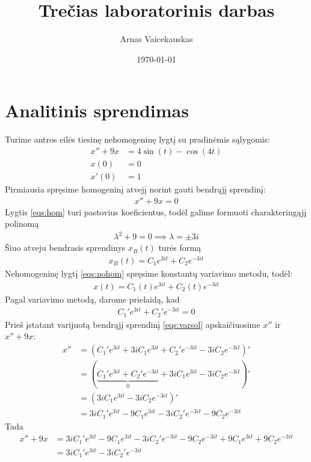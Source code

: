 \documentclass[11pt]{article}
\title{ Trečias laboratorinis darbas}
\author{ Arnas Vaicekauskas }
\date{\today}
\begin{document}
\maketitle

\section{Analitinis sprendimas}
Turime antros eilės tiesinę nehomogeninę lygtį su pradinėmis sąlygomis:
\begin{align}
x''+9x&=4\sin(t)-\cos(4t) \label{eqs:nohom}\\
x(0)&=0\label{eqs:initial-1}\\
x'(0)&=1\label{eqs:initial-2}
\end{align}
Pirmiausia spręsime homogeninį atvejį norint gauti bendrąjį sprendinį:
\begin{align}
    x''+9x=0 \label{eqs:hom}
\end{align}
Lygtis \eqref{eqs:hom} turi pastovius koeficientus, 
todėl galime formuoti charakteringąjį polinomą
\begin{align*}
    \lambda^2+9=0\implies\lambda=\pm3i
\end{align*}
Šiuo atveju bendrasis sprendinys $x_B(t)$ turės formą 
\begin{align*}
x_B(t)=C_1e^{3it}+C_2e^{-3it}
\end{align*}
Nehomogeninę lygtį \eqref{eqs:nohom} spręsime
konstantų variavimo metodu, todėl:
\begin{align}
x(t)=C_1(t)e^{3it}+C_2(t)e^{-3it} \label{eqs:varsol}
\end{align}
Pagal variavimo metodą, darome prielaidą, kad 
\begin{align}
C_1'e^{3it}+C_2'e^{-3it}=0  \label{eqs:assumtion}
\end{align}
Prieš įstatant varijuotą bendrąjį sprendinį \eqref{eqs:varsol} apskaičiuosime $x''$ ir $x''+9x$: 
\begin{align*}
x''&=(C_1'e^{3it}+3iC_1e^{3it}+C_2'e^{-3it}-3iC_2e^{-3it})'\\
&=(\underbrace{C_1'e^{3it}+C_2'e^{-3it}}_0+3iC_1e^{3it}-3iC_2e^{-3it})'\\
&=(3iC_1e^{3it}-3iC_2e^{-3it})'\\
&=3iC_1'e^{3it}-9C_1e^{3it}-3iC_2'e^{-3it}-9C_2e^{-3it}
\end{align*}
Tada
\begin{align*}
x''+9x&=3iC_1'e^{3it}-9C_1e^{3it}-3iC_2'e^{-3it}-9C_2e^{-3it}+9C_1e^{3it}+9C_2e^{-3it}\\
&=3iC_1'e^{3it}-3iC_2'e^{-3it}
\end{align*}
\end{document}
